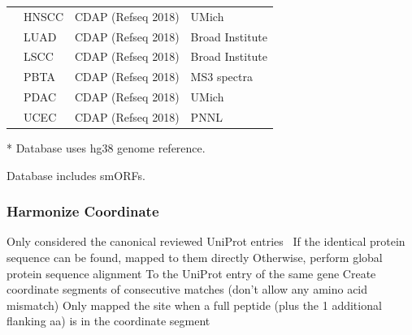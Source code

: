 \begin{table}[tbp]
\begin{threeparttable}[b]
\begin{tabular}{@{}llll@{}}
        & HNSCC & CDAP (Refseq 2018) & UMich \\
        & LUAD  & CDAP (Refseq 2018)\tnote{\textdagger} & Broad Institute \\
        & LSCC  & CDAP (Refseq 2018)\tnote{\textdagger} & Broad Institute \\
        & PBTA  & CDAP (Refseq 2018) & MS3 spectra \\
        & PDAC  & CDAP (Refseq 2018) & UMich \\
        & UCEC  & CDAP (Refseq 2018) & PNNL \\
    \bottomrule
    \end{tabular}
    \begin{tablenotes}
    \item [*] Database uses hg38 genome reference.
    \item [\textdagger] Database includes smORFs.
    \end{tablenotes}
    \end{threeparttable}
\end{table}


\subsubsection{Harmonize Coordinate}
Only considered the canonical reviewed UniProt entries 
If the identical protein sequence can be found, mapped to them directly
Otherwise, perform global protein sequence alignment
To the UniProt entry of the same gene
Create coordinate segments of consecutive matches (don't allow any amino acid mismatch)
Only mapped the site when a full peptide (plus the 1 additional flanking aa) is in the coordinate segment

